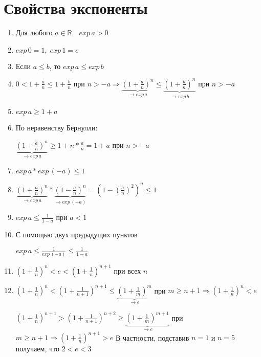\documentclass[12pt,letterpaper]{report}
\makeatletter
\theoremstyle{definition}
\renewenvironment{proof}[1][\proofname]{%
   \par\pushQED{\qed}\normalfont%
   \topsep6\p@\@plus6\p@\relax
   \trivlist\item[\hskip\labelsep\bfseries#1\@addpunct{.}]%
   \ignorespaces
}{%
   \popQED\endtrivlist\@endpefalse
}
\makeatother
\begin{document}
    \section{Свойства экспоненты}
    \begin{enumerate}
        \item Для любого $a \in \mathbb{R} \quad exp\,a > 0$
        \item $exp\,0 = 1,\; exp\,1 = e$
        \item Если $a \leqslant b$, то $exp\,a \leqslant exp\,b$
        \begin{proof}
            $0 < 1 + \frac{a}{n} \leqslant 1 + \frac{b}{n}$ при $n > -a \Rightarrow \underbrace{(1 + \frac{a}{n})^n}_{\to exp\,a} \leqslant \underbrace{(1 + \frac{b}{n})^n}_{\to exp\,b}$ при $n > -a$
        \end{proof}
        \item $exp\,a \geqslant 1 + a$
        \begin{proof}
            По неравенству Бернулли:
            
            $\underbrace{(1 + \frac{a}{n})^n}_{\to exp\,a} \geqslant 1 + n * \frac{a}{n} = 1 + a$ при $n > -a$
        \end{proof}
        \item $exp\,a * exp\,(-a) \leqslant 1$
        \begin{proof}
            $\underbrace{(1 + \frac{a}{n})^n}_{\to exp\,a} * \underbrace{(1 - \frac{a}{n})^n}_{\to exp\,(-a)} = (1 - (\frac{a}{n})^2)^n \leqslant 1$
        \end{proof}
        \item $exp\,a \leqslant \frac{1}{1 - a}$ при $a < 1$
        \begin{proof}
            С помощью двух предыдущих пунктов
            
            $exp\,a \leqslant\frac{1}{exp\,(-a)} \leqslant \frac{1}{1 - a}$
        \end{proof}
        \item $(1 + \frac{1}{n})^n < e < (1 + \frac{1}{n})^{n + 1}$ при всех $n$
        \begin{proof}
            $(1 + \frac{1}{n})^n < (1 + \frac{1}{n+1})^{n+1} \leqslant \underbrace{(1 + \frac{1}{m})^{m}}_{\to e}$ при $m
            \geqslant n + 1 \Rightarrow (1 + \frac{1}{n})^n < e$
            
            $(1 + \frac{1}{n})^{n + 1} > (1 + \frac{1}{n+1})^{n + 2} \geqslant \underbrace{(1 + \frac{1}{m})^{m + 1}}_{\to e}$ при $m \geqslant n + 1 \Rightarrow (1 + \frac{1}{n})^{n + 1} > e$
        \end{proof}
        В частности, подставив $n = 1$ и $n = 5$ получаем, что $2 < e < 3$
    \end{enumerate}
    
\end{document}
